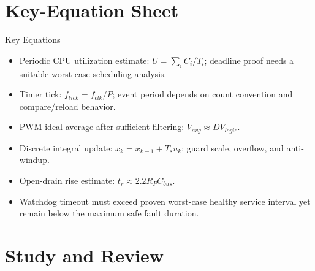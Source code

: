 \documentclass[10pt,letterpaper]{article}
\begin{document}
\section{Key-Equation Sheet}
\begin{CornellExamBox}{Key Equations}
\begin{itemize}
  \item Periodic CPU utilization estimate: $U=\sum_i C_i/T_i$; deadline proof needs a suitable worst-case scheduling analysis.
  \item Timer tick: $f_{tick}=f_{clk}/P$; event period depends on count convention and compare/reload behavior.
  \item PWM ideal average after sufficient filtering: $V_{avg}\approx DV_{logic}$.
  \item Discrete integral update: $x_k=x_{k-1}+T_su_k$; guard scale, overflow, and anti-windup.
  \item Open-drain rise estimate: $t_r\approx2.2R_PC_{bus}$.
  \item Watchdog timeout must exceed proven worst-case healthy service interval yet remain below the maximum safe fault duration.
\end{itemize}\end{CornellExamBox}
\section{Study and Review}
\end{document}
